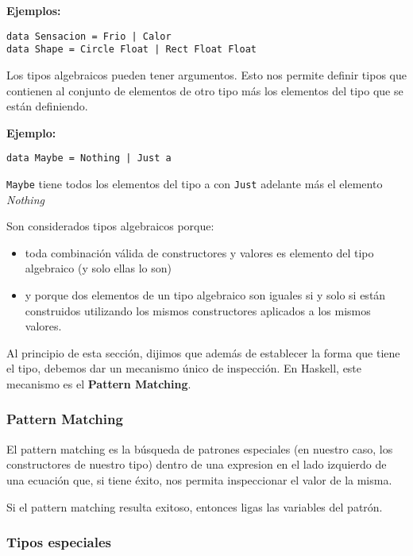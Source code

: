 \documentclass[10pt,a4paper]{article}
\begin{document}
\textbf{Ejemplos:}
\begin{centrado}
	\begin{verbatim}
data Sensacion = Frio | Calor
data Shape = Circle Float | Rect Float Float
	\end{verbatim}
\end{centrado}

Los tipos algebraicos pueden tener argumentos. Esto nos permite definir tipos que contienen al conjunto de elementos de otro tipo más los elementos del tipo que se están definiendo.

\textbf{Ejemplo:}
\begin{centrado}
	\begin{verbatim}
data Maybe = Nothing | Just a
	\end{verbatim}
\end{centrado}
\texttt{Maybe} tiene todos los elementos del tipo a con \texttt{Just} adelante más el elemento \textit{Nothing}

\vspace*{5mm}

Son considerados tipos algebraicos porque:
\begin{itemize}
	\item toda combinación válida de constructores y valores es elemento del tipo algebraico (y solo ellas lo son)
	\item y porque dos elementos de un tipo algebraico son iguales si y solo si están construidos utilizando los mismos constructores aplicados a los mismos valores.
\end{itemize}
Al principio de esta sección, dijimos que además de establecer la forma que tiene el tipo, debemos dar un mecanismo único de inspección. En Haskell, este mecanismo es el \textbf{Pattern Matching}.


\subsubsection{Pattern Matching}
El pattern matching es la búsqueda de patrones especiales (en nuestro caso, los constructores de nuestro tipo) dentro de una expresion en el lado izquierdo de una ecuación que, si tiene éxito, nos permita inspeccionar el valor de la misma.

Si el pattern matching resulta exitoso, entonces ligas las variables del patrón.

\subsubsection{Tipos especiales}
\end{document}
